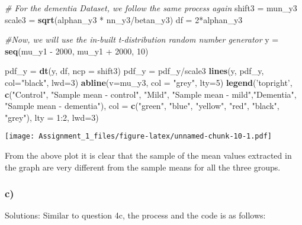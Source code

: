 \documentclass[]{article}
\newenvironment{Shaded}{\begin{snugshade}}{\end{snugshade}}
\newcommand{\KeywordTok}[1]{\textcolor[rgb]{0.13,0.29,0.53}{\textbf{{#1}}}}
\newcommand{\DataTypeTok}[1]{\textcolor[rgb]{0.13,0.29,0.53}{{#1}}}
\newcommand{\DecValTok}[1]{\textcolor[rgb]{0.00,0.00,0.81}{{#1}}}
\newcommand{\StringTok}[1]{\textcolor[rgb]{0.31,0.60,0.02}{{#1}}}
\newcommand{\CommentTok}[1]{\textcolor[rgb]{0.56,0.35,0.01}{\textit{{#1}}}}
\newcommand{\NormalTok}[1]{{#1}}
\begin{document}
\begin{Shaded}
\begin{Highlighting}[]
\CommentTok{# For the dementia Dataset, we follow the same process again}
\NormalTok{shift3 =}\StringTok{ }\NormalTok{mun_y3}
\NormalTok{scale3 =}\StringTok{ }\KeywordTok{sqrt}\NormalTok{(alphan_y3 *}\StringTok{ }\NormalTok{nn_y3/betan_y3)}
\NormalTok{df =}\StringTok{ }\DecValTok{2}\NormalTok{*alphan_y3}

\CommentTok{#Now, we will use the in-built t-distribution random number generator}
\NormalTok{y =}\StringTok{ }\KeywordTok{seq}\NormalTok{(mu_y1 -}\StringTok{ }\DecValTok{2000}\NormalTok{, mu_y1 +}\StringTok{ }\DecValTok{2000}\NormalTok{, }\DecValTok{10}\NormalTok{)}

\NormalTok{pdf_y =}\StringTok{ }\KeywordTok{dt}\NormalTok{(y, df, }\DataTypeTok{ncp =} \NormalTok{shift3)}
\NormalTok{pdf_y =}\StringTok{ }\NormalTok{pdf_y/scale3}
\KeywordTok{lines}\NormalTok{(y, pdf_y, }\DataTypeTok{col=}\StringTok{"black"}\NormalTok{, }\DataTypeTok{lwd=}\DecValTok{3}\NormalTok{)}
\KeywordTok{abline}\NormalTok{(}\DataTypeTok{v=}\NormalTok{mu_y3, }\DataTypeTok{col =} \StringTok{"grey"}\NormalTok{, }\DataTypeTok{lty=}\DecValTok{5}\NormalTok{)}
\KeywordTok{legend}\NormalTok{(}\StringTok{'topright'}\NormalTok{, }\KeywordTok{c}\NormalTok{(}\StringTok{"Control"}\NormalTok{, }\StringTok{"Sample mean - control"}\NormalTok{, }\StringTok{"Mild"}\NormalTok{, }\StringTok{"Sample mean - mild"}\NormalTok{,}\StringTok{"Dementia"}\NormalTok{, }\StringTok{"Sample mean - dementia"}\NormalTok{), }\DataTypeTok{col =} \KeywordTok{c}\NormalTok{(}\StringTok{"green"}\NormalTok{, }\StringTok{"blue"}\NormalTok{, }\StringTok{"yellow"}\NormalTok{, }\StringTok{"red"}\NormalTok{, }\StringTok{"black"}\NormalTok{, }\StringTok{"grey"}\NormalTok{), }\DataTypeTok{lty =} \DecValTok{1}\NormalTok{:}\DecValTok{2}\NormalTok{, }\DataTypeTok{lwd=}\DecValTok{3}\NormalTok{)}
\end{Highlighting}
\end{Shaded}

\texttt{[image: Assignment\_1\_files/figure-latex/unnamed-chunk-10-1.pdf]}

From the above plot it is clear that the sample of the mean values
extracted in the graph are very different from the sample means for all
the three groups.

\subsubsection{c)}\label{c-2}

Solutions: Similar to question 4c, the process and the code is as
follows:
\end{document}

